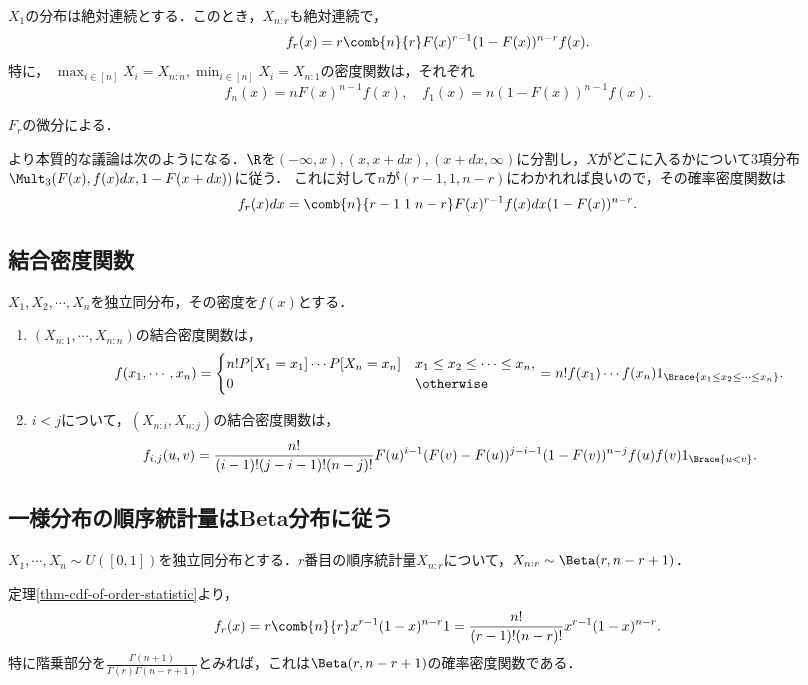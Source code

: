 \documentclass[uplatex,dvipdfmx]{jsreport}
\begin{document}
\begin{corollary}
    $X_1$の分布は絶対連続とする．このとき，$X_{n:r}$も絶対連続で，
    \[f_r(x)=r\comb{n}{r}F(x)^{r-1}(1-F(x))^{n-r}f(x).\]
    特に，
    $\max_{i\in[n]}X_i=X_{n:n},\min_{i\in[n]}X_i=X_{n:1}$の密度関数は，それぞれ
    \[f_n(x)=nF(x)^{n-1}f(x),\quad f_1(x)=n(1-F(x))^{n-1}f(x).\]
\end{corollary}
\begin{Proof}
    $F_r$の微分による．
\end{Proof}
\begin{remarks}
    より本質的な議論は次のようになる．$\R$を$(-\infty,x),(x,x+dx),(x+dx,\infty)$に分割し，$X$がどこに入るかについて3項分布$\Mult_3(F(x),f(x)dx,1-F(x+dx))$に従う．
    これに対して$n$が$(r-1,1,n-r)$にわかれれば良いので，その確率密度関数は
    \[f_r(x)dx=\comb{n}{r-1\;1\;n-r}F(x)^{r-1}f(x)dx(1-F(x))^{n-r}.\]
\end{remarks}

\subsection{結合密度関数}

\begin{proposition}
    $X_1,X_2,\cdots,X_n$を独立同分布，その密度を$f(x)$とする．
    \begin{enumerate}
        \item $(X_{n:1},\cdots,X_{n:n})$の結合密度関数は，
        \[f(x_1,\cdots,x_n)=\begin{cases}
            n!P[X_1=x_1]\cdots P[X_n=x_n]&x_1\le x_2\le\cdots\le x_n,\\
            0&\otherwise
        \end{cases}=n!f(x_1)\cdots f(x_n)1_{\Brace{x_1\le x_2\le\cdots\le x_n}}.\]
        \item $i<j$について，$(X_{n:i},X_{n:j})$の結合密度関数は，
        \[f_{i,j}(u,v)=\frac{n!}{(i-1)!(j-i-1)!(n-j)!}F(u)^{i-1}(F(v)-F(u))^{j-i-1}(1-F(v))^{n-j}f(u)f(v)1_{\Brace{u<v}}.\]
    \end{enumerate}
\end{proposition}

\subsection{一様分布の順序統計量はBeta分布に従う}

\begin{corollary}[一様分布の順序統計量の密度]
    $X_1,\cdots,X_n\sim U([0,1])$を独立同分布とする．$r$番目の順序統計量$X_{n:r}$について，$X_{n:r}\sim\Beta(r,n-r+1)$．
\end{corollary}
\begin{Proof}
    定理\ref{thm-cdf-of-order-statistic}より，
    \[f_r(x)=r\comb{n}{r}x^{r-1}(1-x)^{n-r}1=\frac{n!}{(r-1)!(n-r)!}x^{r-1}(1-x)^{n-r}.\]
    特に階乗部分を$\frac{\Gamma(n+1)}{\Gamma(r)\Gamma(n-r+1)}$とみれば，これは$\Beta(r,n-r+1)$の確率密度関数である．
\end{Proof}
\end{document}
